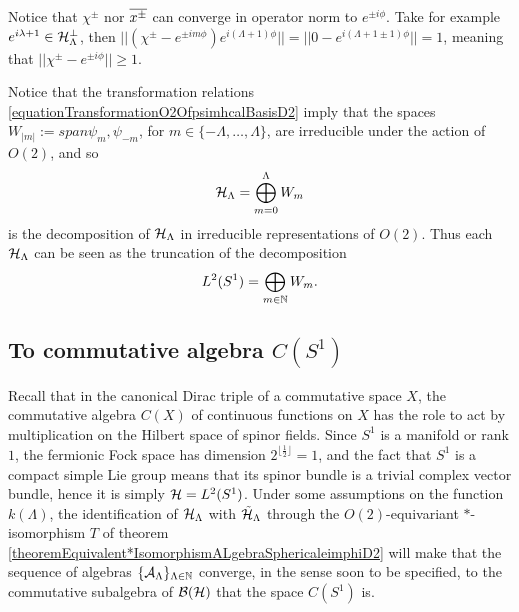 Notice that $\chi^\pm$ nor $\overline{x^\pm}$ can converge in operator norm to $e^{\pm i\phi}$. Take for example $e^{i \lambda + 1} \in \mathcal H_\Lambda^\perp$, then $||(\chi^\pm -e^{\pm i m \phi})e^{i(\Lambda+1)\phi} || = ||0 - e^{i (\Lambda + 1 \pm 1) \phi}|| = 1$, meaning that $||\chi^\pm - e^{\pm i \phi}|| \geq 1$.

Notice that the transformation relations \eqref{equationTransformationO2OfpsimhcalBasisD2} imply that the spaces $W_{|m|} := span{\psi_m, \psi_{-m}}$, for $m \in \{-\Lambda, \dots, \Lambda\}$, are irreducible under the action of $O(2)$, and so
\begin{equation}
    \mathcal H_\Lambda = \bigoplus_{m = 0}^{\Lambda} W_m
\end{equation}
is the decomposition of $\mathcal H_\Lambda$ in irreducible representations of $O(2)$. Thus each $\mathcal H_\Lambda$ can be seen as the truncation of the decomposition
\begin{equation}
    L^2(S^1) = \bigoplus_{m  \in \mathbb{N}} W_m.
\end{equation}


\subsection{To commutative algebra $C(S^1)$}

Recall that in the canonical Dirac triple of a commutative space $X$, the commutative algebra $C(X)$ of continuous functions on $X$ has the role to act by multiplication on the Hilbert space of spinor fields. Since $S^1$ is a manifold or rank $1$, the fermionic Fock space has dimension $2^{\lfloor \frac{1}{2}\rfloor} = 1$, and the fact that $S^1$ is a compact simple Lie group means that its spinor bundle is a trivial complex vector bundle\cite{}, hence it is simply $\mathcal H = L^2(S^1)$. Under some assumptions on the function $k(\Lambda)$, the identification of $\mathcal H_\Lambda$ with $\tilde {\mathcal H}_\Lambda$ through the $O(2)$-equivariant $*$-isomorphism $T$ of theorem \ref{theoremEquivalent*IsomorphismALgebraSphericaleimphiD2} will make that the sequence of algebras $\{\mathcal A_\Lambda\}_{\Lambda \in \mathbb{N}}$ converge, in the sense soon to be specified, to the commutative subalgebra of $\mathcal B(\mathcal H)$ that the space $C(S^1)$ is.

